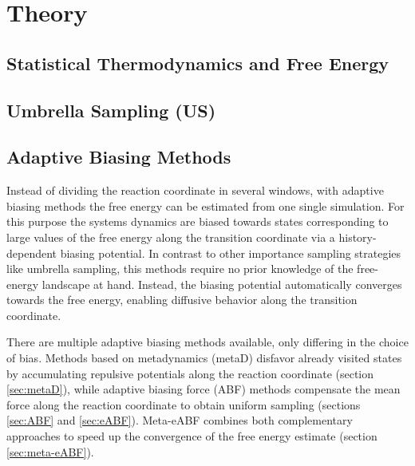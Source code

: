 \chapter{Theory}
\label{cha:theory}

\section{Statistical Thermodynamics and Free Energy}

\section{Umbrella Sampling (US)}
\label{sec:umbrella theory}

\section{Adaptive Biasing Methods}
\label{sec:adaptive biasing}

Instead of dividing the reaction coordinate in several windows, with adaptive biasing methods the free energy can be estimated from one single simulation. For this purpose the systems dynamics are biased towards states corresponding to large values of the free energy along the transition coordinate via a history-dependent biasing potential. In contrast to other importance sampling strategies like umbrella sampling, this methods require no prior knowledge of the free-energy landscape at hand. Instead, the biasing potential automatically converges towards the free energy, enabling diffusive behavior along the transition coordinate.

There are multiple adaptive biasing methods available, only differing in the choice of bias. Methods based on metadynamics (metaD) disfavor already visited states by accumulating repulsive potentials along the reaction coordinate (section \ref{sec:metaD}), while adaptive biasing force (ABF) methods compensate the mean force along the reaction coordinate to obtain uniform sampling (sections \ref{sec:ABF} and \ref{sec:eABF}). Meta-eABF combines both complementary approaches to speed up the convergence of the free energy estimate (section \ref{sec:meta-eABF}).


